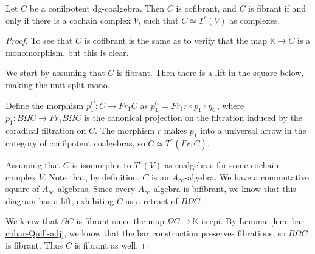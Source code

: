 \documentclass[../thesis.tex]{subfiles}
\begin{document}
        \begin{proposition}
            Let $C$ be a conilpotent dg-coalgebra. Then $C$ is cofibrant, and $C$ is fibrant if and only if there is a cochain complex $V$, such that $C \simeq T^c(V)$ as complexes.
        \end{proposition}

        \begin{proof}
            To see that $C$ is cofibrant is the same as to verify that the map $\mathbb{K}\rightarrow C$ is a monomorphism, but this is clear.

            We start by assuming that $C$ is fibrant. Then there is a lift in the square below, making the unit split-mono.
            \begin{center}
            \end{center}
            Define the morphism $p_1^C: C \rightarrow Fr_1C$ as $p_1^C = Fr_1r\circ p_1\circ \eta_C$, where $p_1: B\Omega C \rightarrow Fr_1 B\Omega C$ is the canonical projection on the filtration induced by the coradical filtration on $C$. The morphism $r$ makes $p_1$ into a universal arrow in the category of conilpotent coalgebras, so $C \simeq T^c(\overline{Fr_1C})$.

            Assuming that $C$ is isomorphic to $T^c(V)$ as coalgebras for some cochain complex $V$. Note that, by definition, $C$ is an $A_\infty$-algebra. We have a commutative square of $A_\infty$-algebras. Since every $A_\infty$-algebra is bifibrant, we know that this diagram has a lift, exhibiting $C$ as a retract of $B\Omega C$.
            \begin{center}
            \end{center}

            We know that $\Omega C$ is fibrant since the map $\Omega C \rightarrow \mathbb{K}$ is epi. By Lemma~\ref{lem: bar-cobar-Quill-adj}, we know that the bar construction preserves fibrations, so $B\Omega C$ is fibrant. Thus $C$ is fibrant as well.
        \end{proof}
\end{document}
